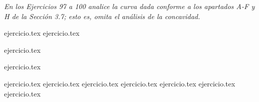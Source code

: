 \vspace{1em}
\noindent \textit{En los Ejercicios 97 a 100 analice la curva dada conforme a los apartados A-F y H de la Sección 3.7; esto es, omita el análisis de la concavidad.}

\begin{enumerate}
    \setcounter{enumi}{96}
    \begin{minipage}{0.45\textwidth}
    {ejercicio.tex}
{ejercicio.tex}
\end{minipage}%
    \begin{minipage}{0.45\textwidth}
    \setcounter{enumi}{97}
    {ejercicio.tex}
\addtocounter{enumi}{1}
    {ejercicio.tex}
\end{minipage}
\end{enumerate}

\vspace{1em}
\begin{enumerate}
    \setcounter{enumi}{100}
    {ejercicio.tex}
{ejercicio.tex}
{ejercicio.tex}
{ejercicio.tex}
{ejercicio.tex}
{ejercicio.tex}
{ejercicio.tex}
\end{enumerate}